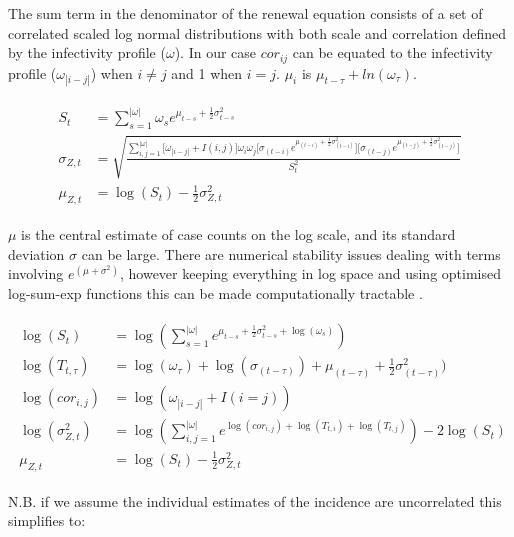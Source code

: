 \documentclass[10pt,letterpaper]{article}
\begin{document}
The sum term in the denominator of the renewal equation consists of a set of correlated scaled log normal distributions with both scale and correlation defined by the infectivity profile ($\omega$). In our case $cor_{ij}$ can be equated to the infectivity profile ($\omega_{|i-j|}$) when $i \neq j$ and 1 when $i = j$. $\mu_i$ is $\mu_{t-\tau} + ln(\omega_{\tau})$.

\begin{eqnarray}
\begin{aligned}
	S_{t} &= \sum_{s=1}^{|\omega|} { \omega_s e^{\mu_{t-s} + \frac{1}{2}\sigma_{t-s}^2 }} \\
	\sigma_{Z,t} &= \sqrt{
	  \frac{
	    \sum_{i,j=1}^{|\omega|} {
  	    \big[\omega_{|i-j|}+I(i,j)\big] \omega_i \omega_j \big[\sigma_{(t-i)} e^{\mu_{(t-i)}+\frac{1}{2}\sigma_{(t-i)}^2}\big] \big[\sigma_{(t-j)} e^{\mu_{(t-j)}+\frac{1}{2}\sigma_{(t-j)}^2}\big]
	    }
	  }{S_{t}^2}
	}	\\
	\mu_{Z,t} &= \log\left( S_{t} \right) - \frac{1}{2}\sigma_{Z,t}^2
\end{aligned}
\end{eqnarray}

$\mu$ is the central estimate of case counts on the log scale, and its standard deviation $\sigma$ can be large. There are numerical stability issues dealing with terms involving $e^{(\mu+\sigma^2)}$, however keeping everything in log space and using optimised log-sum-exp functions this can be made computationally tractable \cite{blanchard2021}.

\begin{eqnarray}
\begin{aligned}
	\log(S_{t}) &= \log(\sum_{s=1}^{|\omega|} {  e^{\mu_{t-s} + \frac{1}{2}\sigma_{t-s}^2 + \log(\omega_s) }}) \\
	\log(T_{t,\tau}) &= \log(\omega_{\tau}) + \log(\sigma_{(t-{\tau})}) + \mu_{(t-{\tau})} + \frac{1}{2}\sigma_{(t-{\tau})}^2) \\
	\log(cor_{i,j}) &= \log(\omega_{|i-j|}+I(i=j)) \\
	\log(\sigma_{Z,t}^2) &= \log(
	    \sum_{i,j=1}^{|\omega|} {
  	      e^{
  	        \log(cor_{i,j}) + \log(T_{t,i}) + \log(T_{t,j})
  	      }
	    }) - 2 \log(S_{t}) \\
	\mu_{Z,t} &= \log( S_{t} ) - \frac{1}{2}\sigma_{Z,t}^2
\end{aligned}
\end{eqnarray}

N.B. if we assume the individual estimates of the incidence are uncorrelated this
simplifies to:
\end{document}
